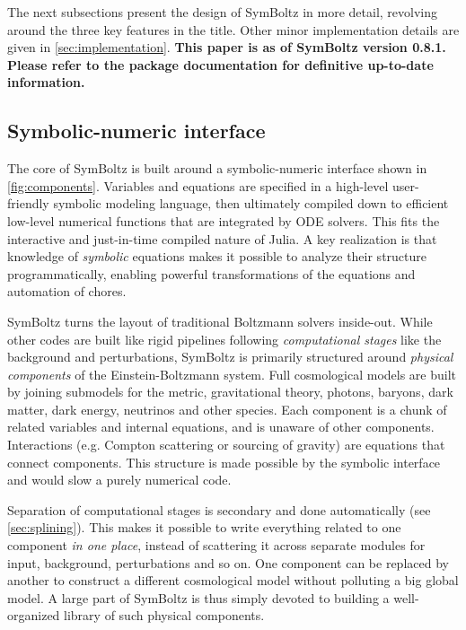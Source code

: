 \documentclass{aa}
\begin{document}
The next subsections present the design of SymBoltz in more detail, revolving around the three key features in the title.
Other minor implementation details are given in \cref{sec:implementation}.
\textbf{This paper is as of SymBoltz version 0.8.1. Please refer to the package documentation for definitive up-to-date information.}

\subsection{Symbolic-numeric interface}
\label{sec:symbolicnumeric}

The core of SymBoltz is built around a symbolic-numeric interface shown in \cref{fig:components}.
Variables and equations are specified in a high-level user-friendly symbolic modeling language, then ultimately compiled down to efficient low-level numerical functions that are integrated by ODE solvers.
This fits the interactive and just-in-time compiled nature of Julia.
A key realization is that knowledge of \emph{symbolic} equations makes it possible to analyze their structure programmatically, enabling powerful transformations of the equations and automation of chores.

SymBoltz turns the layout of traditional Boltzmann solvers inside-out.
While other codes are built like rigid pipelines following \emph{computational stages} like the background and perturbations,
SymBoltz is primarily structured around \emph{physical components} of the Einstein-Boltzmann system.
Full cosmological models are built by joining submodels for the metric, gravitational theory, photons, baryons, dark matter, dark energy, neutrinos and other species.
Each component is a chunk of related variables and internal equations, and is unaware of other components.
Interactions (e.g. Compton scattering or sourcing of gravity) are equations that connect components.
This structure is made possible by the symbolic interface and would slow a purely numerical code.

Separation of computational stages is secondary and done automatically (see \cref{sec:splining}).
This makes it possible to write everything related to one component \emph{in one place}, instead of scattering it across separate modules for input, background, perturbations and so on.
One component can be replaced by another to construct a different cosmological model without polluting a big global model.
A large part of SymBoltz is thus simply devoted to building a well-organized library of such physical components.
\end{document}
